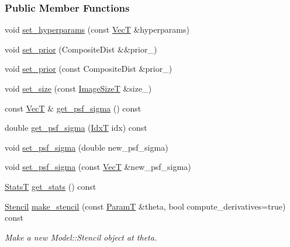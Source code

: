 \subsubsection*{Public Member Functions}
\begin{DoxyCompactItemize}
\item 
void \hyperlink{classmappel_1_1Gauss2DModel_a7041d1f38f1141773b046489ce6e6b11}{set\+\_\+hyperparams} (const \hyperlink{namespacemappel_a2225ad69f358daa3f4f99282a35b9a3a}{VecT} \&hyperparams)
\item 
void \hyperlink{classmappel_1_1Gauss2DModel_a41a5b18b3f3779562c0dbd19e1b6e29b}{set\+\_\+prior} (Composite\+Dist \&\&prior\+\_\+)
\item 
void \hyperlink{classmappel_1_1Gauss2DModel_a3c9d7cb15022f51ee4138feff10f930c}{set\+\_\+prior} (const Composite\+Dist \&prior\+\_\+)
\item 
void \hyperlink{classmappel_1_1Gauss2DModel_a8d92d03d6801a59de097d599c798dc79}{set\+\_\+size} (const \hyperlink{classmappel_1_1ImageFormat2DBase_a49cccf61eb2a768a202634d27fcd81d5}{Image\+SizeT} \&size\+\_\+)
\item 
const \hyperlink{namespacemappel_a2225ad69f358daa3f4f99282a35b9a3a}{VecT} \& \hyperlink{classmappel_1_1Gauss2DModel_a8c486209390a402c96e6816b794cd0e6}{get\+\_\+psf\+\_\+sigma} () const 
\item 
double \hyperlink{classmappel_1_1Gauss2DModel_a723817b4af0498e9e1fe0baeed865132}{get\+\_\+psf\+\_\+sigma} (\hyperlink{namespacemappel_ab17ec0f30b61ece292439d7ece81d3a8}{IdxT} idx) const 
\item 
void \hyperlink{classmappel_1_1Gauss2DModel_ae089ec4fb64b04d2bbefe6506f1f8085}{set\+\_\+psf\+\_\+sigma} (double new\+\_\+psf\+\_\+sigma)
\item 
void \hyperlink{classmappel_1_1Gauss2DModel_abe39c2b7eb4eaaca9e67cdf6cfe441dc}{set\+\_\+psf\+\_\+sigma} (const \hyperlink{namespacemappel_a2225ad69f358daa3f4f99282a35b9a3a}{VecT} \&new\+\_\+psf\+\_\+sigma)
\item 
\hyperlink{namespacemappel_a04ab395b0cf82c4ce68a36b2212649a5}{StatsT} \hyperlink{classmappel_1_1Gauss2DModel_a8aecb8960e94b03499110e08f5d18c7f}{get\+\_\+stats} () const 
\item 
\hyperlink{classmappel_1_1Gauss2DModel_1_1Stencil}{Stencil} \hyperlink{classmappel_1_1Gauss2DModel_a584652e2d4ac0b27e870a21150c035a2}{make\+\_\+stencil} (const \hyperlink{classmappel_1_1PointEmitterModel_a665ec6aea3aac139bb69a23c06d4b9a1}{ParamT} \&theta, bool compute\+\_\+derivatives=true) const 
\begin{DoxyCompactList}\small\item\em Make a new Model\+::\+Stencil object at theta. \end{DoxyCompactList}\item 

\end{DoxyCompactItemize}
